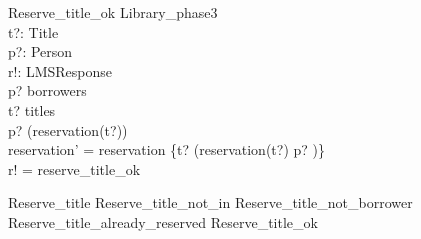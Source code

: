 \documentclass[11pt, fuzz]{article}
\begin{document}
\begin{schema}{Reserve\_title\_ok}
    \Delta Library\_phase3 \\
    t?: Title              \\
    p?: Person             \\
    r!: LMSResponse        \\
\where    
    p? \in borrowers                \\
    t? \in titles                   \\  
    p? \notin \ran(reservation(t?))  \\

    reservation' = reservation \oplus \{t? \mapsto (reservation(t?) \cat \langle p? \rangle)\} \\
    r! = reserve\_title\_ok
\end{schema}


\begin{zed}
Reserve\_title  Reserve\_title\_not\_in \lor Reserve\_title\_not\_borrower \\ \lor Reserve\_title\_already\_reserved \lor Reserve\_title\_ok 
\end{zed}
\end{document}
